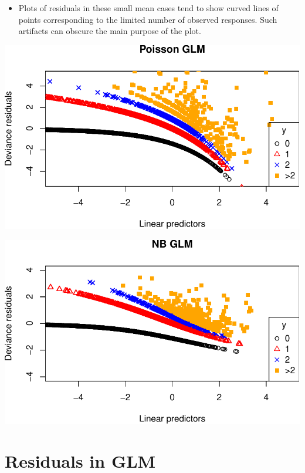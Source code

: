 \documentclass[
  ignorenonframetext,
]{beamer}
\providecommand{\tightlist}{%
  \setlength{\itemsep}{0pt}\setlength{\parskip}{0pt}}
\begin{document}
\begin{frame}{}
\protect\hypertarget{section-1}{}
\begin{itemize}
\tightlist
\item
  Plots of residuals in these small mean cases tend to show curved lines
  of points corresponding to the limited number of observed responses.
  Such artifacts can obscure the main purpose of the plot.
\end{itemize}

\includegraphics{week8_p1_files/figure-beamer/unnamed-chunk-3-1.pdf}
\end{frame}

\begin{frame}{}
\protect\hypertarget{section-2}{}
\includegraphics{week8_p1_files/figure-beamer/unnamed-chunk-4-1.pdf}
\end{frame}

\hypertarget{residuals-in-glm}{%
\section{Residuals in GLM}\label{residuals-in-glm}}
\end{document}
